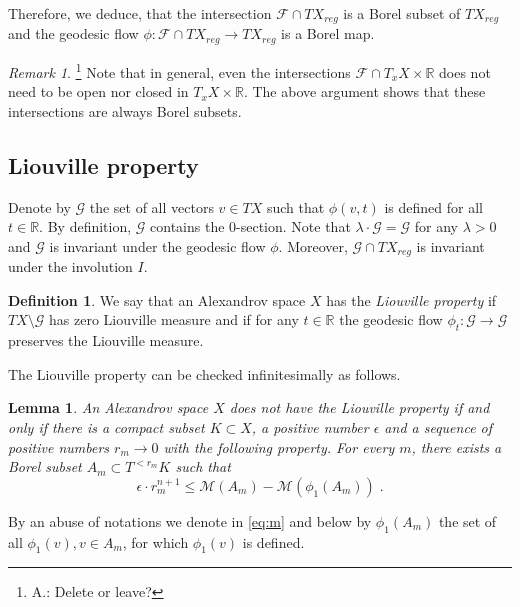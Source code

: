 \documentclass[12pt,leqno,intlimits]{amsart}
\numberwithin{equation}{section}
\newtheorem{lem}[thm]{Lemma}
\theoremstyle{definition}
\newtheorem{defn}[thm]{Definition}%
\theoremstyle{remark}
\newtheorem{rem}[thm]{Remark}
\newcommand{\R}{\mathbb{R}}
\def\:{\colon}
\begin{document}
Therefore, we deduce, that the intersection $\mathcal F\cap TX_{reg}$ is a Borel subset of $TX_{reg}$ and the geodesic flow
$\phi :\mathcal F\cap TX_{reg} \to TX_{reg}$ is a Borel map.

\begin{rem}  \footnote{A.: Delete or leave? }
Note that in general, even the intersections $\mathcal F\cap T_xX \times \R$ does not need to be open nor closed in $T_xX \times \R$.
The above argument shows that these intersections are always Borel subsets.
\end{rem}






\subsection{Liouville property}
Denote by $\mathcal G$ the set of all vectors $v\in TX $ such that $\phi (v,t)$ is defined for all $t\in \R$. 
By definition, $\mathcal G$ contains the $0$-section.
Note that $\lambda\cdot \mathcal G=\mathcal G$ for any $\lambda >0$ 
and $\mathcal G$ is invariant under the geodesic flow $\phi$. 
Moreover, $\mathcal G\cap TX_{reg}$ is invariant under the involution $I$.

\begin{defn}
 We say that an Alexandrov space $X$ has the \emph{Liouville property} if  $TX\setminus \mathcal G$ has zero Liouville measure  and if
for any $t\in \R$ the geodesic flow $\phi _t \:\mathcal G\to \mathcal G$ preserves the Liouville measure.
\end{defn}

The Liouville property can be checked infinitesimally as follows.

\begin{lem} \label{infini}
An Alexandrov space $X$ does not have the Liouville property if and only if there is a compact subset $K\subset X$, a positive number
$\epsilon$ and a sequence of positive numbers  $r_m \to 0$  with the following property.
 For every  $m$, there exists a Borel subset $A_m\subset T^{<r_m} K$ such that
 \begin{equation} \label{eq:m}
\epsilon \cdot r_m^{n +1} \leq \mathcal M (A_m) -\mathcal M (\phi _1 (A_m)) \;.
\end{equation}
\end{lem}
By an abuse of notations we denote in \eqref{eq:m}  and below by  $\phi_1 (A_m)$ the set of all $\phi _1(v), v\in A_m$, for which
$\phi _1(v)$ is defined.
\end{document}
